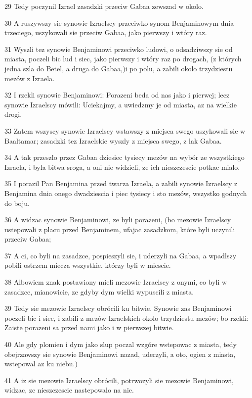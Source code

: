 \par 29 Tedy poczynil Izrael zasadzki przeciw Gabaa zewszad w okolo.
\par 30 A ruszywszy sie synowie Izraelscy przeciwko synom Benjaminowym dnia trzeciego, uszykowali sie przeciw Gabaa, jako pierwszy i wtóry raz.
\par 31 Wyszli tez synowie Benjaminowi przeciwko ludowi, o odsadziwszy sie od miasta, poczeli bic lud i siec, jako pierwszy i wtóry raz po drogach, (z których jedna szla do Betel, a druga do Gabaa,)i po polu, a zabili okolo trzydziestu mezów z Izraela.
\par 32 I rzekli synowie Benjaminowi: Porazeni beda od nas jako i pierwej; lecz synowie Izraelscy mówili: Uciekajmy, a uwiedzmy je od miasta, az na wielkie drogi.
\par 33 Zatem wszyscy synowie Izraelscy wstawszy z miejsca swego uszykowali sie w Baaltamar; zasadzki tez Izraelskie wyszly z miejsca swego, z lak Gabaa.
\par 34 A tak przeszlo przez Gabaa dziesiec tysiecy mezów na wybór ze wszystkiego Izraela, i byla bitwa sroga, a oni nie widzieli, ze ich nieszczescie potkac mialo.
\par 35 I porazil Pan Benjamina przed twarza Izraela, a zabili synowie Izraelscy z Benjamina dnia onego dwadziescia i piec tysiecy i sto mezów, wszystko godnych do boju.
\par 36 A widzac synowie Benjaminowi, ze byli porazeni, (bo mezowie Izraelscy ustepowali z placu przed Benjaminem, ufajac zasadzkom, które byli uczynili przeciw Gabaa;
\par 37 A ci, co byli na zasadzce, pospieszyli sie, i uderzyli na Gabaa, a wpadlszy pobili ostrzem miecza wszystkie, którzy byli w miescie.
\par 38 Albowiem znak postawiony mieli mezowie Izraelscy z onymi, co byli w zasadzce, mianowicie, ze gdyby dym wielki wypuscili z miasta.
\par 39 Tedy sie mezowie Izraelscy obrócili ku bitwie. Synowie zas Benjaminowi poczeli bic i siec, i zabili z mezów Izraelskich okolo trzydziestu mezów; bo rzekli: Zaiste porazeni sa przed nami jako i w pierwszej bitwie.
\par 40 Ale gdy plomien i dym jako slup poczal wzgóre wstepowac z miasta, tedy obejrzawszy sie synowie Benjaminowi nazad, uderzyli, a oto, ogien z miasta, wstepowal az ku niebu.)
\par 41 A iz sie mezowie Izraelscy obrócili, potrwozyli sie mezowie Benjaminowi, widzac, ze nieszczescie nastepowalo na nie.

